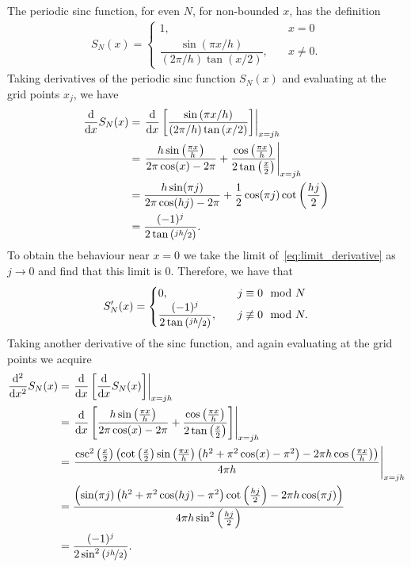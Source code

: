 \documentclass[12pt]{article}
\begin{document}
The periodic sinc function, for even $N$, for non-bounded $x$, has the definition
\begin{align}
	S_{N}(x) = 
	\begin{cases}
		1,&\quad x = 0\\
		\dfrac{\sin\left(\pi x/h\right)}{\left(2\pi/h\right)\tan\left(x/2\right)},&\quad x\neq 0.
	\end{cases}
\end{align}
Taking derivatives of the periodic sinc function $S_{N}(x)$ and evaluating at the grid points $x_{j}$, we have
\begin{subequations}
	\begin{align}
		\dv{}{x}S_{N}(x) &= \left.\dv{}{x}\left[\dfrac{\sin\left(\pi x/h\right)}{\left(2\pi/h\right)\tan\left(x/2\right)}\right]\right|_{x=jh}\\
		&= \left.\frac{h\sin\left(\frac{\pi x}{h}\right)}{2 \pi  \cos (x)-2 \pi }+\dfrac{\cos\left(\frac{\pi x}{h}\right)}{2\tan\left(\frac{x}{2}\right)}\right|_{x=jh}\\
		&=\frac{h\sin(\pi j)}{2\pi\cos(hj)-2\pi}+\frac{1}{2} \cos(\pi j)\cot \left(\frac{hj}{2}\right)\label{eq:limit_derivative}\\
		&= \dfrac{(-1)^{j}}{2\tan\left(\nicefrac{jh}{2}\right)}.
	\end{align}
\end{subequations}
To obtain the behaviour near $x=0$ we take the limit of~\eqref{eq:limit_derivative} as $j\to 0$ and find that this limit is 0.
Therefore, we have that
\begin{align}
	S_{N}^{\prime}(x) = 
	\begin{cases}
	0,&\quad j \equiv 0 \mod N \\
	\dfrac{(-1)^{j}}{2\tan\left(\nicefrac{jh}{2}\right)},&\quad j\not\equiv 0 \mod N.
	\end{cases}
\end{align}
Taking another derivative of the sinc function, and again evaluating at the grid points we acquire
\begin{subequations}
	\begin{align}
	\dv[2]{}{x}S_{N}(x) &= \left.\dv{}{x}\left[\dv{}{x}S_{N}(x)\right]\right|_{x=jh}\\
	&= \left.\dv{}{x}\left[\frac{h\sin\left(\frac{\pi x}{h}\right)}{2 \pi  \cos (x)-2 \pi }+\dfrac{\cos\left(\frac{\pi x}{h}\right)}{2\tan\left(\frac{x}{2}\right)}\right]\right|_{x=jh}\\
	&= \left.\frac{\csc^2\left(\frac{x}{2}\right)\left(\cot \left(\frac{x}{2}\right)\sin\left(\frac{\pi x}{h}\right) \left(h^2+\pi ^2 \cos (x)-\pi^2\right)-2\pi h\cos\left(\frac{\pi x}{h}\right)\right)}{4 \pi h}\right|_{x=jh}\\
	&= \frac{\left(\sin(\pi j)\left(h^2+\pi^2\cos(hj)-\pi^2\right)\cot\left(\frac{h j}{2}\right)-2 \pi h \cos(\pi j)\right)}{4 \pi h\sin^2\left(\frac{hj}{2}\right)}\label{eq:limit_derivative2}\\	
	&= \dfrac{(-1)^{j}}{2\sin^{2}\left(\nicefrac{jh}{2}\right)}.
	\end{align}
\end{subequations}
\end{document}

